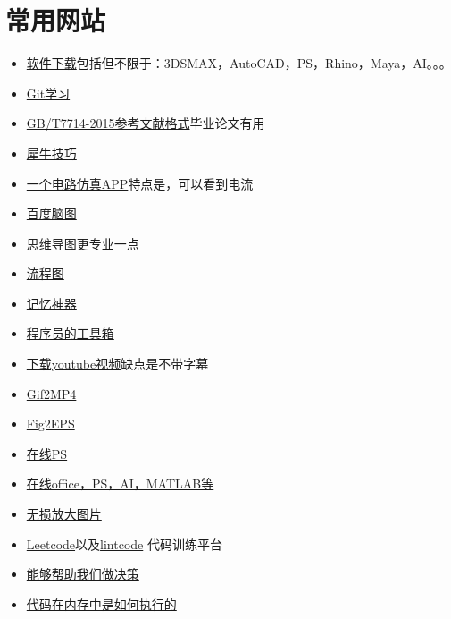 \documentclass[UTF8,oneside]{ctexbook}
\begin{document}
\section{常用网站}
\begin{itemize}
	\item \href{https://www.3d66.com/popsoft_26.html}{软件下载}包括但不限于：3DSMAX，AutoCAD，PS，Rhino，Maya，AI。。。
	\item \href{http://gitbook.liuhui998.com/index.html}{Git学习}
	\item \href{http://www.latexstudio.net/archives/6888.html}{GB/T7714-2015参考文献格式}毕业论文有用
	\item \href{http://www.xuexiniu.com/forum.php?mod=forumdisplay&fid=102&filter=typeid&typeid=1}{犀牛技巧}
	\item \href{https://www.52pojie.cn/thread-716675-1-1.html}{一个电路仿真APP}特点是，可以看到电流
	\item \href{http://naotu.baidu.com/file/97d9cd5ca30672903a3e3321e62c6ed8}{百度脑图}
	\item \href{https://mm.edrawsoft.cn/map.html?obj=wxoa3v5wBLcpmgCifx59_Uzk5X4qHU/Personal/未命名文件.emmx}{思维导图}更专业一点
	\item \href{https://www.processon.com/login;jsessionid=022BCDCA031DD3C240BE7FD87D942F03.jvm1?backUrl=/diagraming/5be7a513e4b0d74dc539976e}{流程图}
	\item \href{https://ankiweb.net/shared/decks/}{记忆神器}
	\item \href{https://tool.lu}{程序员的工具箱}
	\item \href{http://www.ytube.win}{下载youtube视频}缺点是不带字幕
	\item \href{https://cloudconvert.com/gif-to-mp4}{Gif2MP4}
	\item \href{https://cn.office-converter.com/FIG-to-EPS}{Fig2EPS}
	\item \href{https://www.photopea.com}{在线PS}
	\item \href{https://uzer.me/u/signin}{在线office，PS，AI，MATLAB等}
	\item \href{https://bigjpg.com}{无损放大图片}
	\item \href{https://leetcode.com}{Leetcode}以及\href{https://www.lintcode.com/zh-cn/accounts/signup/}{lintcode} 代码训练平台
	\item \href{https://www.slant.co}{能够帮助我们做决策}
	\item \href{http://www.pythontutor.com}{代码在内存中是如何执行的}
\end{itemize}
\end{document}
